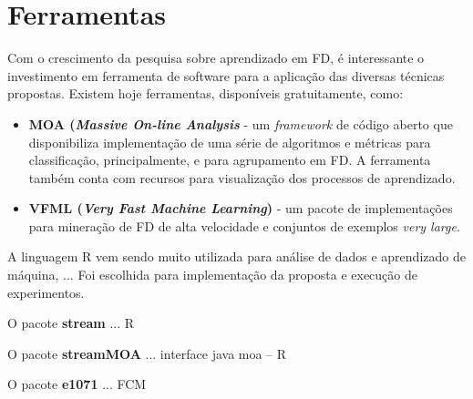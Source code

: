 \section{Ferramentas}

Com o crescimento da pesquisa sobre aprendizado em FD, é interessante o investimento em ferramenta de software para a aplicação das diversas técnicas propostas. Existem hoje ferramentas, disponíveis gratuitamente, como:

\begin{itemize}
    \item \textbf{MOA (\emph{Massive On-line Analysis}} \cite{MOA} - um \emph{framework} de código aberto que disponibiliza implementação de uma série de algoritmos e métricas para classificação, principalmente, e para agrupamento em FD. A ferramenta também conta com recursos para visualização dos processos de aprendizado.
    
    \item \textbf{VFML (\emph{Very Fast Machine Learning})} \cite{VFML} - um pacote de implementações para mineração de FD de alta velocidade e conjuntos de exemplos \emph{very large}.%
\end{itemize}

A linguagem R \cite{linguagemR} vem sendo muito utilizada para análise de dados e aprendizado de máquina, ... Foi escolhida para implementação da proposta e execução de experimentos.

O pacote \textbf{stream} \cite{lingR_Stream} ... R

O pacote \textbf{streamMOA} \cite{lingR_StreamMOA} ...  interface java moa  -- R

O pacote \textbf{e1071} \cite{lingR_e1071} ... FCM
